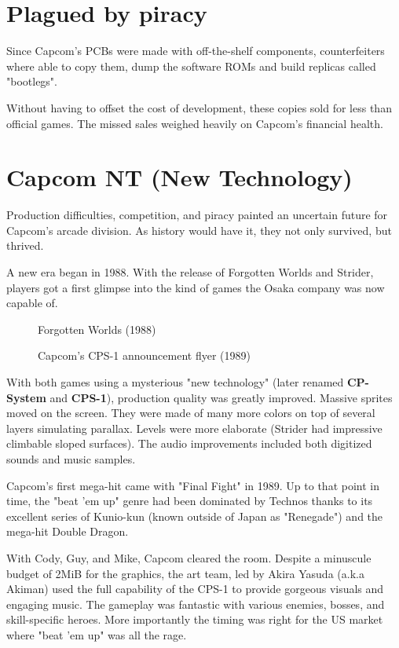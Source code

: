 \section{Plagued by piracy}
Since Capcom's PCBs were made with off-the-shelf components, counterfeiters where able to copy them, dump the software ROMs and build replicas called "bootlegs". 

Without having to offset the cost of development, these copies sold for less than official games. The missed sales weighed heavily on Capcom's financial health. 




\section{Capcom NT (New Technology)}
Production difficulties, competition, and piracy painted an uncertain future for Capcom's arcade division. As history would have it, they not only survived, but thrived.

A new era began in 1988. With the release of Forgotten Worlds and Strider, players got a first glimpse into the kind of games the Osaka company was now capable of.  



\label{nin_fw}
\begin{figure}[H]
\caption*{Forgotten Worlds (1988)}
\end{figure}



 
\label{fw_flyer}
  \begin{figure}[H]
  \caption*{Capcom's CPS-1 announcement flyer (1989)}
  \end{figure}

With both games using a mysterious "new technology" (later renamed \textbf{CP-System} and \textbf{CPS-1}), production quality was greatly improved. Massive sprites moved on the screen. They were made of many more colors on top of several layers simulating parallax. Levels were more elaborate (Strider had impressive climbable sloped surfaces). The audio improvements included both digitized sounds and music samples.

Capcom's first mega-hit came with "Final Fight" in 1989. Up to that point in time, the "beat 'em up" genre had been dominated by Technos thanks to its excellent series of Kunio-kun (known outside of Japan as "Renegade") and the mega-hit Double Dragon. 

With Cody, Guy, and Mike, Capcom cleared the room. Despite a minuscule budget of 2MiB for the graphics, the art team, led by Akira Yasuda (a.k.a Akiman) used the full capability of the CPS-1 to provide gorgeous visuals and engaging music. The gameplay was fantastic with various enemies, bosses, and skill-specific heroes. More importantly the timing was right for the US market where "beat 'em up" was all the rage.



